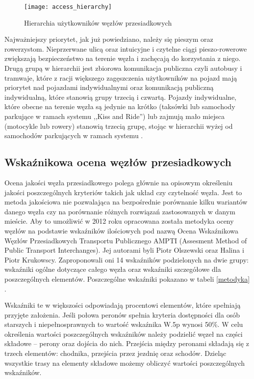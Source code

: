 \documentclass[twoside,12pt]{article}
\begin{document}
	\begin{figure}[H]
		\centering
		\texttt{[image: access\_hierarchy]}\\
		\caption{Hierarchia użytkowników węzłów przesiadkowych}
		\label{access-hierarchy}
	\end{figure}
	
	Najważniejszy priorytet, jak już powiedziano, należy się pieszym oraz rowerzystom. Nieprzerwane ulicą oraz intuicyjne i czytelne ciągi pieszo-rowerowe zwiększają bezpieczeństwo na terenie węzła i zachęcają do korzystania z niego. Drugą grupą w hierarchii jest zbiorowa komunikacja publiczna czyli autobusy i tramwaje, które z racji większego zagęszczenia użytkowników na pojazd mają priorytet nad pojazdami indywidualnymi oraz komunikacją publiczną indywidualną, które stanowią grupy trzecią i czwartą. Pojazdy indywidualne, które obecne na terenie węzła są jedynie na krótko (taksówki lub samochody parkujące w ramach systemu ,,Kiss and Ride'') lub zajmują mało miejsca (motocykle lub rowery) stanowią trzecią grupę, stojąc w hierarchii wyżej od samochodów parkujących w ramach systemu \pnr{} \cite{guidelines_washington}.
	
	\clearpage
	\subsection{Wskaźnikowa ocena węzłów przesiadkowych}
	
	Ocena jakości węzła przesiadkowego polega głównie na opisowym określeniu jakości poszczególnych kryteriów takich jak układ czy czytelność węzła. Jest to metoda jakościowa nie pozwalająca na bezpośrednie porównanie kilku wariantów danego węzła czy na porównanie różnych rozwiązań zastosowanych w danym mieście. Aby to umożliwić w 2012 roku opracowana została metodyka oceny węzłów na podstawie wskaźników ilościowych pod nazwą Ocena Wskaźnikowa Węzłów Przesiadkowych Transportu Publicznego AMPTI (Assesment Method of Public Transport Interchanges). Jej autorami byli Piotr Olszewski oraz Halina i Piotr Krukowscy. Zaproponowali oni 14 wskaźników podzielonych na dwie grupy: wskaźniki ogólne dotyczące całego węzła oraz wskaźniki szczegółowe dla poszczególnych elementów. Poszczególne wskaźniki pokazano w tabeli \ref{metodyka} \cite{metodyka}. 
	
	Wskaźniki te w większości odpowiadają procentowi elementów, które spełniają przyjęte założenia. Jeśli połowa peronów spełnia kryteria dostępności dla osób starszych i niepełnosprawnych to wartość wskaźnika W.5p wynosi 50\%. W celu określenia wartości poszczególnych wskaźników należy podzielić węzeł na części składowe -- perony oraz dojścia do nich. Przejścia między peronami składają się z trzech elementów: chodnika, przejścia przez jezdnię oraz schodów. Dzieląc wszystkie trasy na elementy składowe możemy obliczyć wartości poszczególnych wskaźników.
	
\end{document}
